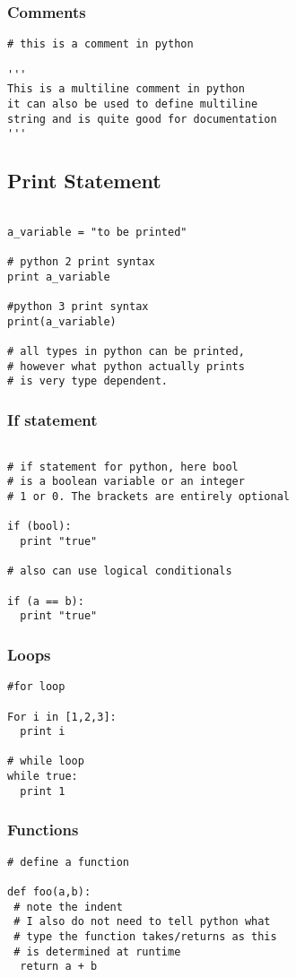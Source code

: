 \documentclass[11pt,a4paper]{article}
\begin{document}
\subsubsection{Comments}
\begin{verbatim}
# this is a comment in python

'''
This is a multiline comment in python
it can also be used to define multiline
string and is quite good for documentation
'''

\end{verbatim}

\subsection{Print Statement}
\begin{verbatim}

a_variable = "to be printed"

# python 2 print syntax
print a_variable

#python 3 print syntax
print(a_variable)

# all types in python can be printed,
# however what python actually prints
# is very type dependent.

\end{verbatim}

\subsubsection{If statement}
\begin{verbatim}

# if statement for python, here bool
# is a boolean variable or an integer
# 1 or 0. The brackets are entirely optional

if (bool):
  print "true"

# also can use logical conditionals

if (a == b):
  print "true"

\end{verbatim}


\subsubsection{Loops}
\begin{verbatim}
#for loop

For i in [1,2,3]:
  print i 

# while loop
while true:
  print 1
\end{verbatim}

\subsubsection{Functions}
\begin{verbatim}
# define a function

def foo(a,b):
 # note the indent
 # I also do not need to tell python what
 # type the function takes/returns as this
 # is determined at runtime
  return a + b 
  
\end{verbatim}
\end{document}
